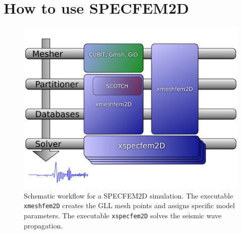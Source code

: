 \documentclass[oneside,english,onecolumn,letterpaper]{book}
\begin{document}

\section{How to use SPECFEM2D}

\begin{figure}[htbp]
\centering
\includegraphics[width=.6\textwidth]{figures/workflow}

\caption{Schematic workflow for a SPECFEM2D simulation. The executable \texttt{xmeshfem2D} creates the GLL mesh points and assigns specific model parameters. The executable \texttt{xspecfem2D} solves the seismic wave propagation.}

\label{fig:workflow.databases}
\end{figure}
\end{document}
